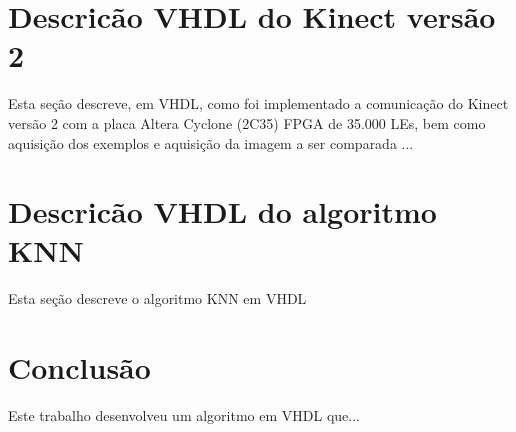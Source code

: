 \documentclass[12pt]{article}
\begin{document}
\section{Descric\~ao VHDL do Kinect vers\~ao 2}

Esta seção descreve, em VHDL, como foi implementado a comunicação do Kinect 
versão 2 com a placa Altera Cyclone (2C35) FPGA de 35.000 LEs, bem como 
aquisição dos exemplos e aquisição da imagem a ser comparada ...

\section{Descric\~ao VHDL do algoritmo KNN}

Esta seção descreve o algoritmo KNN em VHDL


\section{Conclus\~ao}\label{sec:figs}

Este trabalho desenvolveu um algoritmo em VHDL que...









\end{document}
